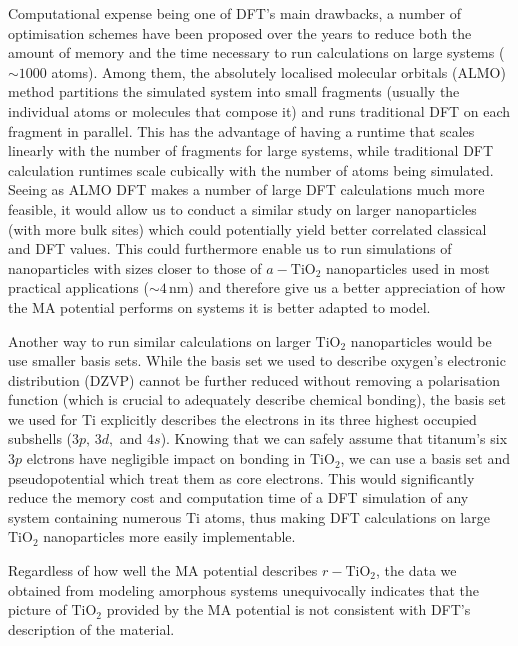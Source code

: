 \documentclass[aps,prb,twocolumn,amsmath,amssymb,superscriptaddress,longbibliography]{revtex4-1}
\newcommand\tab[1][1cm]{\hspace*{#1}} %
\begin{document}
\tab Computational expense being one of DFT's main drawbacks, a number of optimisation schemes have been proposed over the years to reduce both the amount of memory and the time necessary to run calculations on large systems ($\sim 1000$ atoms).
Among them, the absolutely localised molecular orbitals\cite{almo} (ALMO) method partitions the simulated system into small fragments (usually the individual atoms or molecules that compose it) and runs traditional DFT on each fragment in parallel.
This has the advantage of having a runtime that scales linearly with the number of fragments for large systems, while traditional DFT calculation runtimes scale cubically with the number of atoms being simulated.
Seeing as ALMO DFT makes a number of large DFT calculations much more feasible, it would allow us to conduct a similar study on larger nanoparticles (with more bulk sites) which could potentially yield better correlated classical and DFT values.
This could furthermore enable us to run simulations of nanoparticles with sizes closer to those of $a-\text{TiO}_2$ nanoparticles used in most practical applications ($\sim 4\,$nm\cite{realistic_nnp}) and therefore give us a better appreciation of how the MA potential performs on systems it is better adapted to model.

\tab Another way to run similar calculations on larger $\text{TiO}_2$ nanoparticles would be use smaller basis sets.
While the basis set we used to describe oxygen's electronic distribution (DZVP) cannot be further reduced without removing a polarisation function (which is crucial to adequately describe chemical bonding), the basis set we used for Ti explicitly describes the electrons in its three highest occupied subshells ($3p,\,3d,$ and $4s$).
Knowing that we can safely assume that titanum's six $3p$ elctrons have negligible impact on bonding in $\text{TiO}_2$\cite{electronic_structure}, we can use a basis set and pseudopotential which treat them as core electrons.
This would significantly reduce the memory cost and computation time of a DFT simulation of any system containing numerous Ti atoms, thus making DFT calculations on large $\text{TiO}_2$ nanoparticles more easily implementable.

\tab Regardless of how well the MA potential describes $r-\text{TiO}_2$, the data we obtained from modeling amorphous systems unequivocally indicates that the picture of $\text{TiO}_2$ provided by the MA potential is not consistent with DFT's description of the material.
\end{document}
